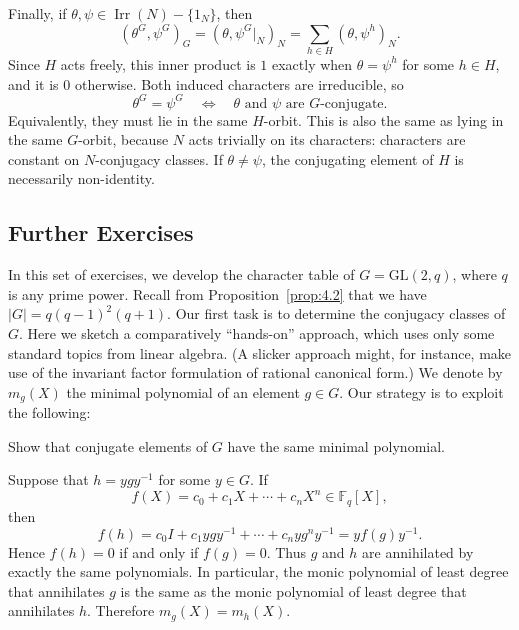 \documentclass[../Odyssey_Project.tex]{subfiles}
\begin{document}
\begin{solution}
    Finally, if $\theta,\psi\in\operatorname{Irr}(N)-\{1_N\}$, then
    \[
        (\theta^G,\psi^G)_G
        =
        (\theta,\psi^G|_N)_N
        =
        \sum_{h\in H}(\theta,\psi^h)_N.
    \]
    Since $H$ acts freely, this inner product is $1$ exactly when $\theta=\psi^h$ for some $h\in H$, and it is $0$ otherwise. Both induced characters are irreducible, so
    \[
        \theta^G=\psi^G
        \quad\Longleftrightarrow\quad
        \theta\text{ and }\psi\text{ are $G$-conjugate}.
    \]
    Equivalently, they must lie in the same $H$-orbit. This is also the same as lying in the same $G$-orbit, because $N$ acts trivially on its characters: characters are constant on $N$-conjugacy classes. If $\theta\neq\psi$, the conjugating element of $H$ is necessarily non-identity.
\end{solution}

\subsection*{Further Exercises}

\noindent In this set of exercises, we develop the character table of $G = \mathrm{GL}(2, q)$, where $q$ is any prime power. Recall from Proposition~\ref{prop:4.2} that we have $|G| = q (q-1)^2 (q+1)$. Our first task is to determine the conjugacy classes of $G$. Here we sketch a comparatively ``hands-on'' approach, which uses only some standard topics from linear algebra. (A slicker approach might, for instance, make use of the invariant factor formulation of rational canonical form.) We denote by $m_g(X)$ the minimal polynomial of an element $g \in G$. Our strategy is to exploit the following:

\begin{exercise}
\label{ex:16.8}
Show that conjugate elements of $G$ have the same minimal polynomial.
\end{exercise}
\begin{solution}
    Suppose that $h=ygy^{-1}$ for some $y\in G$. If
    \[
        f(X)=c_0+c_1X+\cdots+c_nX^n\in\mathbb{F}_q[X],
    \]
    then
    \[
        f(h)
        =
        c_0I+c_1ygy^{-1}+\cdots+c_nyg^ny^{-1}
        =
        yf(g)y^{-1}.
    \]
    Hence $f(h)=0$ if and only if $f(g)=0$. Thus $g$ and $h$ are annihilated by exactly the same polynomials. In particular, the monic polynomial of least degree that annihilates $g$ is the same as the monic polynomial of least degree that annihilates $h$. Therefore $m_g(X)=m_h(X)$.
\end{solution}
\end{document}
